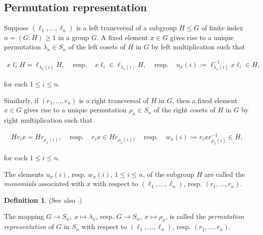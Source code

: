 \documentclass{amsart}
\theoremstyle{definition}
\newtheorem{definition}{Definition}[section]
\numberwithin{equation}{section}
\begin{document}
\normalsize

\subsection{Permutation representation}
\label{ss:PermRepr}

Suppose \((\ell_1,\ldots,\ell_n)\) is a left transversal of a subgroup \(H\le G\) of finite index \(n=(G:H)\ge 1\) in a group \(G\).
A fixed element \(x\in G\) gives rise to a unique permutation \(\lambda_x\in S_n\) of the left cosets of \(H\) in \(G\)
by left multiplication such that

\begin{equation}
\label{eqn:LeftPerm}
\begin{array}{ccccc}
x\ell_iH=\ell_{\lambda_x(i)}H, & \text{ resp. } & x\ell_i\in\ell_{\lambda_x(i)}H, & \text{ resp. } & u_x(i):=\ell_{\lambda_x(i)}^{-1}x\ell_i\in H,
\end{array}
\end{equation}

\noindent
for each \(1\le i\le n\).

Similarly, if \((r_1,\ldots,r_n)\) is a right transversal of \(H\) in \(G\), then
a fixed element \(x\in G\) gives rise to a unique permutation \(\rho_x\in S_n\) of the right cosets of \(H\) in \(G\)
by right multiplication such that

\begin{equation}
\label{eqn:RightPerm}
\begin{array}{ccccc}
Hr_ix=Hr_{\rho_x(i)}, & \text{ resp. } & r_ix\in Hr_{\rho_x(i)}, & \text{ resp. } & w_x(i):=r_ixr_{\rho_x(i)}^{-1}\in H,
\end{array}
\end{equation}

\noindent
for each \(1\le i\le n\).

The elements \(u_x(i)\), resp. \(w_x(i)\), \(1\le i\le n\), of the subgroup \(H\)
are called the \textit{monomials} associated with \(x\)
with respect to \((\ell_1,\ldots,\ell_n)\), resp. \((r_1,\ldots,r_n)\).


\begin{definition}
\label{dfn:PermRepr}
(See also \cite[Hauptsatz 6.2, p.28]{Hp}.)

The mapping \(G\to S_n,\ x\mapsto\lambda_x\), resp. \(G\to S_n,\ x\mapsto\rho_x\),
is called the \textit{permutation representation} of \(G\) in \(S_n\)
with respect to \((\ell_1,\ldots,\ell_n)\), resp. \((r_1,\ldots,r_n)\).

\end{definition}
\end{document}
